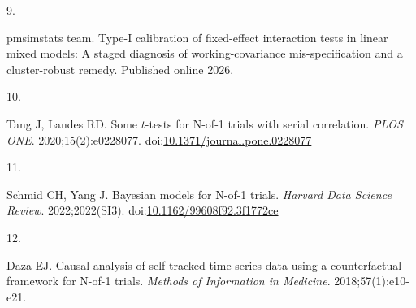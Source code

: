 \documentclass[
  11pt,
]{article}
\newlength{\cslhangindent}
\newlength{\csllabelwidth}
\newenvironment{CSLReferences}[2] %
 {\begin{list}{}{%
  \setlength{\itemindent}{0pt}
  \setlength{\leftmargin}{0pt}
  \setlength{\parsep}{0pt}
  \ifodd #1
   \setlength{\leftmargin}{\cslhangindent}
   \setlength{\itemindent}{-1\cslhangindent}
  \fi
  \setlength{\itemsep}{#2\baselineskip}}}
 {\end{list}}
\newcommand{\CSLLeftMargin}[1]{\parbox[t]{\csllabelwidth}{\strut#1\strut}}
\newcommand{\CSLRightInline}[1]{\parbox[t]{\linewidth - \csllabelwidth}{\strut#1\strut}}
\begin{document}
\begin{CSLReferences}{0}{1}
\CSLLeftMargin{9. }%
\CSLRightInline{{pmsimstats team}. Type-{I} calibration of fixed-effect interaction tests in linear mixed models: A staged diagnosis of working-covariance mis-specification and a cluster-robust remedy. Published online 2026.}

\CSLLeftMargin{10. }%
\CSLRightInline{Tang J, Landes RD. Some \(t\)-tests for {N}-of-1 trials with serial correlation. \emph{PLOS ONE}. 2020;15(2):e0228077. doi:\href{https://doi.org/10.1371/journal.pone.0228077}{10.1371/journal.pone.0228077}}

\CSLLeftMargin{11. }%
\CSLRightInline{Schmid CH, Yang J. Bayesian models for {N}-of-1 trials. \emph{Harvard Data Science Review}. 2022;2022(SI3). doi:\href{https://doi.org/10.1162/99608f92.3f1772ce}{10.1162/99608f92.3f1772ce}}

\CSLLeftMargin{12. }%
\CSLRightInline{Daza EJ. Causal analysis of self-tracked time series data using a counterfactual framework for {N}-of-1 trials. \emph{Methods of Information in Medicine}. 2018;57(1):e10-e21.}

\end{CSLReferences}
\end{document}
